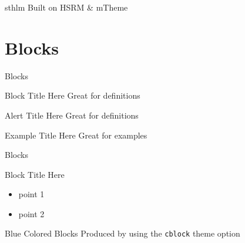 \documentclass[newPxFont]{beamer}
\begin{document}
\begin{frame}[c]{sthlm Built on HSRM \& mTheme}
\begin{frame}[plain]

\end{frame}
\endgroup

\begingroup
{}
\begin{frame}[plain]


\end{frame}
\endgroup


\section{Blocks}\label{Blocks}



\begin{frame}{Blocks}

\begin{block}{Block Title Here}
		Great for definitions
\end{block}

\begin{alertblock}{Alert Title Here}
		Great for definitions
\end{alertblock}

\begin{exampleblock}{Example Title Here}
		Great for examples
\end{exampleblock}
\end{frame}


\begin{frame}{Blocks}

\begin{block}{Block Title Here}
	\begin{itemize}
		\item point 1
		\item point 2
	\end{itemize}
\end{block}

\begingroup
{}
\begin{block}{Blue Colored Blocks}
	Produced by using the \texttt{cblock} theme option
\end{block}
\endgroup
\end{frame}


\end{frame}
\end{document}
